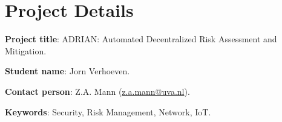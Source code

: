 \section{Project Details}
\hspace{1.15em}
\textbf{Project title}: ADRIAN: Automated Decentralized Risk Assessment and Mitigation.

\textbf{Student name}: Jorn Verhoeven.

\textbf{Contact person}: Z.A. Mann (\href{mailto://z.a.mann@uva.nl}{z.a.mann@uva.nl}).

\textbf{Keywords}: Security, Risk Management, Network, IoT.